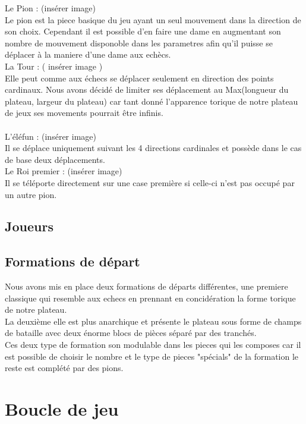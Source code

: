 \documentclass[10pt,a4paper,oneside]{report}
\begin{document}
        Le Pion : (insérer image) \\
        Le pion est la piece basique du jeu ayant un seul mouvement dans la direction de son choix. Cependant il est possible d'en faire une dame en augmentant son nombre de mouvement disponoble dans les parametres afin qu'il puisse se déplacer à la maniere d'une dame aux echècs.\\
        
        La Tour : ( insérer image )\\
        Elle peut comme aux échecs se déplacer seulement en direction des points cardinaux. Nous avons décidé de limiter ses déplacement au Max(longueur du plateau, largeur du plateau) car tant donné l'apparence torique de notre plateau de jeux ses movements pourrait être infinis.\\
        \\
        L'éléfun : (insérer image)\\
        Il se déplace uniquement suivant les 4 directions cardinales et possède dans le cas de base deux déplacements.
        \\
        Le Roi premier : (insérer image)\\
        Il se téléporte directement sur une case première si celle-ci n'est pas occupé par un autre pion.

\subsection{Joueurs}
\subsection{Formations de départ}
        Nous avons mis en place deux formations de départs différentes, une premiere classique qui resemble aux echecs en prennant en concidération la forme torique de notre plateau. \\
        La deuxième elle est plus anarchique et présente le plateau sous forme de champs de bataille avec deux énorme blocs de pièces séparé par des tranchés. \\
        Ces deux type de formation son modulable dans les pieces qui les composes car il est possible de choisir le nombre et le type de pieces "spécials" de la formation le reste est complété par des pions. 
        
\section{Boucle de jeu}
\end{document}
